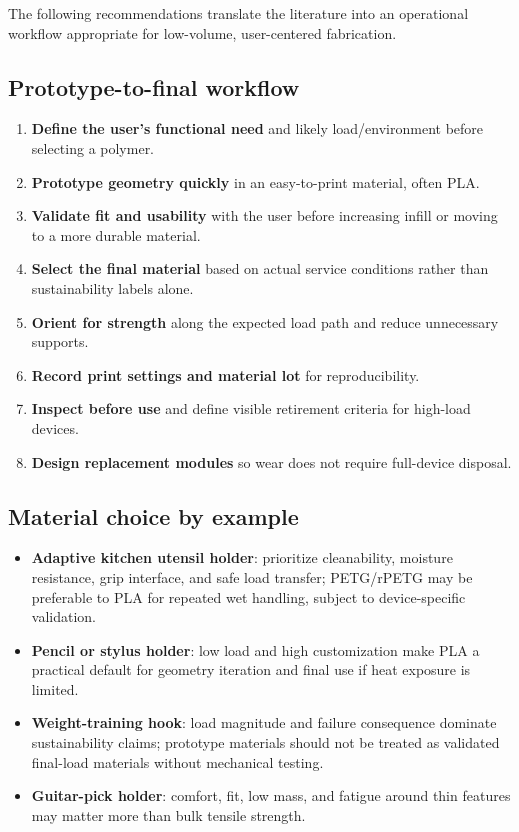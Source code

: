\documentclass[11pt]{article}
\begin{document}
The following recommendations translate the literature into an operational workflow appropriate for low-volume, user-centered fabrication.

\subsection{Prototype-to-final workflow}

\begin{enumerate}
  \item \textbf{Define the user's functional need} and likely load/environment before selecting a polymer.
  \item \textbf{Prototype geometry quickly} in an easy-to-print material, often PLA.
  \item \textbf{Validate fit and usability} with the user before increasing infill or moving to a more durable material.
  \item \textbf{Select the final material} based on actual service conditions rather than sustainability labels alone.
  \item \textbf{Orient for strength} along the expected load path and reduce unnecessary supports.
  \item \textbf{Record print settings and material lot} for reproducibility.
  \item \textbf{Inspect before use} and define visible retirement criteria for high-load devices.
  \item \textbf{Design replacement modules} so wear does not require full-device disposal.
\end{enumerate}

\subsection{Material choice by example}

\begin{itemize}
  \item \textbf{Adaptive kitchen utensil holder}: prioritize cleanability, moisture resistance, grip interface, and safe load transfer; PETG/rPETG may be preferable to PLA for repeated wet handling, subject to device-specific validation.
  \item \textbf{Pencil or stylus holder}: low load and high customization make PLA a practical default for geometry iteration and final use if heat exposure is limited.
  \item \textbf{Weight-training hook}: load magnitude and failure consequence dominate sustainability claims; prototype materials should not be treated as validated final-load materials without mechanical testing.
  \item \textbf{Guitar-pick holder}: comfort, fit, low mass, and fatigue around thin features may matter more than bulk tensile strength.
\end{itemize}
\end{document}
